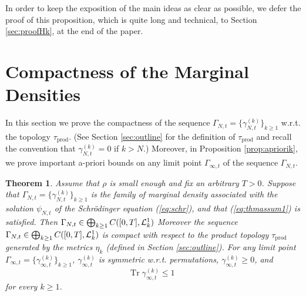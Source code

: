 \documentclass[11pt]{article}
\newtheorem{theorem}{Theorem}[section]
\newcommand{\tr}{\mbox{Tr}}
\newcommand{\wh}{\widehat}
\newcommand{\cL}{{\cal L}}
\begin{document}
In order to keep the exposition of the main ideas as clear as
possible, we defer the proof of this proposition, which is quite
long and technical, to  Section
\ref{sec:proofHk}, at the end of the paper.










\section{Compactness of the Marginal
 Densities}
\setcounter{equation}{0}

In this section we prove the compactness of the sequence $
\Gamma_{N,t} = \{ \gamma^{(k)}_{N,t} \}_{k\ge1}$ w.r.t. the topology
$\tau_{\text{prod}}$. (See Section \ref{sec:outline} for the
definition of $\tau_{\text{prod}}$ and recall the convention that
$\gamma^{(k)}_{N,t}=0$ if $k > N$.)
 Moreover, in Proposition
\ref{prop:apriorik}, we prove important a-priori bounds on any limit
point $\Gamma_{\infty,t}$ of the sequence $\Gamma_{N,t}$.

\begin{theorem}\label{thm:compactness}
Assume that $\rho$ is small enough and fix an arbitrary $T>0$.
Suppose that $\Gamma_{N,t} = \{\gamma^{(k)}_{N,t} \}_{k\geq 1}$ is
the family of marginal density associated with the solution
$\psi_{N,t}$ of the Schr\"odinger equation (\ref{eq:schr}),  and
that (\ref{eq:thmassum1}) is satisfied. Then $\Gamma_{N,t} \in
\bigoplus_{k \geq 1} C([0,T], \cL_k^1)$ Moreover the sequence
$\Gamma_{N,t} \in \bigoplus_{k \geq 1} C([0,T], \cL_k^1)$ is compact
with respect to the product topology $\tau_{\text{prod}}$ generated
by the metrics $\wh \eta_k$ (defined in Section \ref{sec:outline}).
For any limit point $ \Gamma_{\infty,t} = \{ \gamma_{\infty,t}^{(k)}
\}_{k \geq 1}$, $ \gamma^{(k)}_{\infty,t}$ is symmetric w.r.t.
permutations, $ \gamma^{(k)}_{\infty,t} \geq 0$, and
\begin{equation}\label{eq:bou} \tr \; \gamma^{(k)}_{\infty,t} \leq 1
\,\end{equation} for every $k \geq 1$.
\end{theorem}
\end{document}
